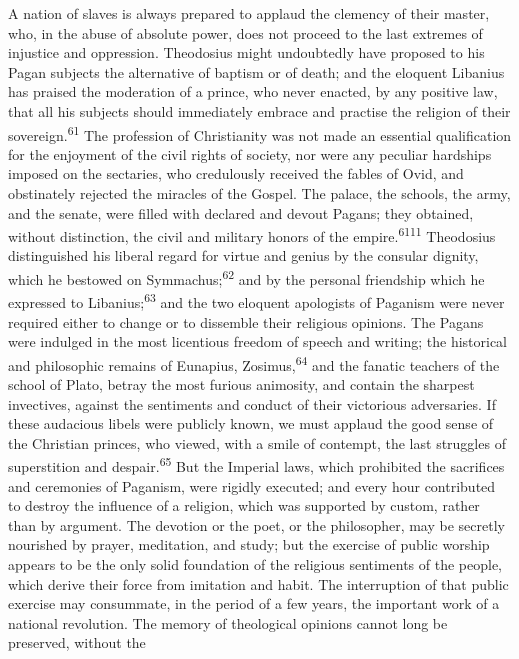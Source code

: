 A nation of slaves is always prepared to applaud the clemency of
their master, who, in the abuse of absolute power, does not
proceed to the last extremes of injustice and oppression.
Theodosius might undoubtedly have proposed to his Pagan subjects
the alternative of baptism or of death; and the eloquent Libanius
has praised the moderation of a prince, who never enacted, by any
positive law, that all his subjects should immediately embrace
and practise the religion of their sovereign.\textsuperscript{61} The profession
of Christianity was not made an essential qualification for the
enjoyment of the civil rights of society, nor were any peculiar
hardships imposed on the sectaries, who credulously received the
fables of Ovid, and obstinately rejected the miracles of the
Gospel. The palace, the schools, the army, and the senate, were
filled with declared and devout Pagans; they obtained, without
distinction, the civil and military honors of the empire.\textsuperscript{6111}
Theodosius distinguished his liberal regard for virtue and genius
by the consular dignity, which he bestowed on Symmachus;\textsuperscript{62} and
by the personal friendship which he expressed to Libanius;\textsuperscript{63} and
the two eloquent apologists of Paganism were never required
either to change or to dissemble their religious opinions. The
Pagans were indulged in the most licentious freedom of speech and
writing; the historical and philosophic remains of Eunapius,
Zosimus,\textsuperscript{64} and the fanatic teachers of the school of Plato,
betray the most furious animosity, and contain the sharpest
invectives, against the sentiments and conduct of their
victorious adversaries. If these audacious libels were publicly
known, we must applaud the good sense of the Christian princes,
who viewed, with a smile of contempt, the last struggles of
superstition and despair.\textsuperscript{65} But the Imperial laws, which
prohibited the sacrifices and ceremonies of Paganism, were
rigidly executed; and every hour contributed to destroy the
influence of a religion, which was supported by custom, rather
than by argument. The devotion or the poet, or the philosopher,
may be secretly nourished by prayer, meditation, and study; but
the exercise of public worship appears to be the only solid
foundation of the religious sentiments of the people, which
derive their force from imitation and habit. The interruption of
that public exercise may consummate, in the period of a few
years, the important work of a national revolution. The memory of
theological opinions cannot long be preserved, without the
